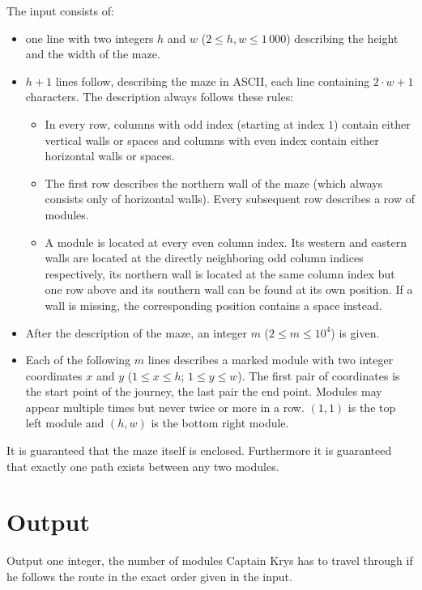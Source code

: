 The input consists of:
\begin{itemize}
  \item one line with two integers $h$ and $w$ ($2 \le h, w \le 1\,000$) describing the height and
  the width of the maze.
  \item $h+1$ lines follow, describing the maze in ASCII, each line containing $2\cdot w+1$
  characters. The description always follows these rules:
  \begin{itemize}
    \item In every row, columns with odd index (starting at index $1$) contain either vertical walls or
    spaces and columns with even index contain either horizontal walls or spaces.
    \item The first row describes the northern wall of the maze (which always consists only of horizontal
    walls). Every subsequent row describes a row of modules.
    \item A module is located at every even column index. Its western and eastern walls are located 
    at the directly neighboring odd column indices respectively, its northern wall is located at the same 
    column index but one row above and its southern wall can be found at its own position. If a wall 
    is missing, the corresponding position contains a space instead.
  \end{itemize}
  \item After the description of the maze, an integer $m$ ($2 \le m \le 10^4$) is given.
  \item Each of the following $m$ lines describes a marked module with two integer
  coordinates $x$ and $y$ ($1 \le x \le h$; $1 \le y \le w$). The first pair of coordinates is the start
  point of the journey, the last pair the end point. Modules may appear multiple times
  but never twice or more in a row. $(1,1)$ is the top left module and $(h,w)$ is the bottom right module.
\end{itemize}

It is guaranteed that the maze itself is enclosed. Furthermore it is guaranteed that exactly one 
path exists between any two modules.

\section*{Output}

Output one integer, the number of modules Captain Krys has to travel
through if he follows the route in the exact order given in the input.

